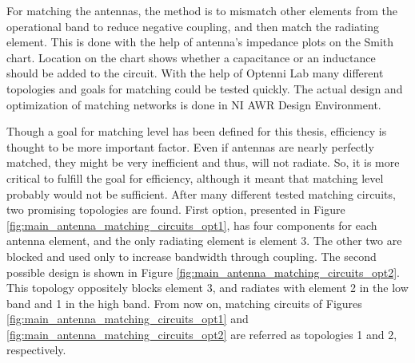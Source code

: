 For matching the antennas, the method is to mismatch other elements from the operational band to reduce negative coupling, and then match the radiating element. This is done with the help of antenna's impedance plots on the Smith chart. Location on the chart shows whether a capacitance or an inductance should be added to the circuit. With the help of Optenni Lab many different topologies and goals for matching could be tested quickly. The actual design and optimization of matching networks is done in NI AWR Design Environment.

Though a goal for matching level has been defined for this thesis, efficiency is thought to be more important factor. Even if antennas are nearly perfectly matched, they might be very inefficient and thus, will not radiate. So, it is more critical to fulfill the goal for efficiency, although it meant that matching level probably would not be sufficient. After many different tested matching circuits, two promising topologies are found. First option, presented in Figure \ref{fig:main_antenna_matching_circuits_opt1}, has four components for each antenna element, and the only radiating element is element 3. The other two are blocked and used only to increase bandwidth through coupling. The second possible design is shown in Figure \ref{fig:main_antenna_matching_circuits_opt2}. This topology oppositely blocks element 3, and radiates with element 2 in the low band and 1 in the high band. From now on, matching circuits of Figures \ref{fig:main_antenna_matching_circuits_opt1} and \ref{fig:main_antenna_matching_circuits_opt2} are referred as topologies 1 and 2, respectively.

